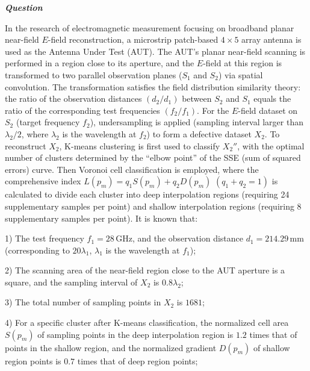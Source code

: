 \begin{tcolorbox}[
    breakable,
    title=Example of Scientific Deep Research in Information,
    colback=LighterGray,
    colframe=DeepPurple,
    colbacktitle=DeepPurple,
    coltitle=White,
]
\textbf{\emph{\textcolor{DeepPurple}{Question}}}

In the research of electromagnetic measurement focusing on broadband planar near-field \(E\)-field reconstruction, a microstrip patch-based \(4 \times 5\) array antenna is used as the Antenna Under Test (AUT). The AUT's planar near-field scanning is performed in a region close to its aperture, and the \(E\)-field at this region is transformed to two parallel observation planes (\(S_1\) and \(S_2\)) via spatial convolution. The transformation satisfies the field distribution similarity theory: the ratio of the observation distances \((d_2/d_1)\) between \(S_2\) and \(S_1\) equals the ratio of the corresponding test frequencies \((f_2/f_1)\). For the \(E\)-field dataset on \(S_2\) (target frequency \(f_2\)), undersampling is applied (sampling interval larger than \(\lambda_2/2\), where \(\lambda_2\) is the wavelength at \(f_2\)) to form a defective dataset \(X_2\). To reconstruct \(X_2\), K-means clustering is first used to classify \(X_2''\), with the optimal number of clusters determined by the ``elbow point'' of the SSE (sum of squared errors) curve. Then Voronoi cell classification is employed, where the comprehensive index \(L(p_m) = q_1 S(p_m) + q_2 D(p_m)\) \((q_1 + q_2 = 1)\) is calculated to divide each cluster into deep interpolation regions (requiring 24 supplementary samples per point) and shallow interpolation regions (requiring 8 supplementary samples per point). It is known that: 

1) The test frequency \(f_1 = 28\,\mathrm{GHz}\), and the observation distance \(d_1 = 214.29\,\mathrm{mm}\) (corresponding to \(20\lambda_1\), \(\lambda_1\) is the wavelength at \(f_1\)); 

2) The scanning area of the near-field region close to the AUT aperture is a square, and the sampling interval of \(X_2\) is \(0.8\lambda_2\); 

3) The total number of sampling points in \(X_2\) is \(1681\); 

4) For a specific cluster after K-means classification, the normalized cell area \(S(p_m)\) of sampling points in the deep interpolation region is \(1.2\) times that of points in the shallow region, and the normalized gradient \(D(p_m)\) of shallow region points is \(0.7\) times that of deep region points; 


\end{tcolorbox}
